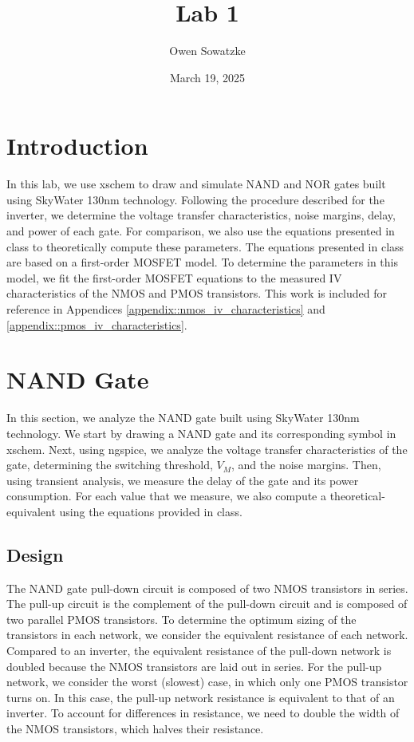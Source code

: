 \documentclass{article}
\title{Lab 1}
\author{Owen Sowatzke}
\date{March 19, 2025}
\newcommand{\zerodisplayskip}{
	\setlength{\abovedisplayskip}{0pt}%
	\setlength{\belowdisplayskip}{0pt}%
	\setlength{\abovedisplayshortskip}{0pt}%
	\setlength{\belowdisplayshortskip}{0pt}%
	\setlength{\mathindent}{0pt}}
\begin{document}
	\maketitle
	
	\section{Introduction}
	
	In this lab, we use xschem to draw and simulate NAND and NOR gates built using SkyWater 130nm technology. Following the procedure described for the inverter, we determine the voltage transfer characteristics, noise margins, delay, and power of each gate. For comparison, we also use the equations presented in class to theoretically compute these parameters. The equations presented in class are based on a first-order MOSFET model. To determine the parameters in this model, we fit the first-order MOSFET equations to the measured IV characteristics of the NMOS and PMOS transistors. This work is included for reference in Appendices \ref{appendix::nmos_iv_characteristics} and \ref{appendix::pmos_iv_characteristics}.
	
	\section{NAND Gate}
	
	In this section, we analyze the NAND gate built using SkyWater 130nm technology. We start by drawing a NAND gate and its corresponding symbol in xschem. Next, using ngspice, we analyze the voltage transfer characteristics of the gate, determining the switching threshold, $V_M$, and the noise margins. Then, using transient analysis, we measure the delay of the gate and its power consumption. For each value that we measure, we also compute a theoretical-equivalent using the equations provided in class.
	
	\subsection{Design}
	
	The NAND gate pull-down circuit is composed of two NMOS transistors in series. The pull-up circuit is the complement of the pull-down circuit and is composed of two parallel PMOS transistors. To determine the optimum sizing of the transistors in each network, we consider the equivalent resistance of each network. Compared to an inverter, the equivalent resistance of the pull-down network is doubled because the NMOS transistors are laid out in series. For the pull-up network, we consider the worst (slowest) case, in which only one PMOS transistor turns on. In this case, the pull-up network resistance is equivalent to that of an inverter. To account for differences in resistance, we need to double the width of the NMOS transistors, which halves their resistance. 
	
\end{document}
